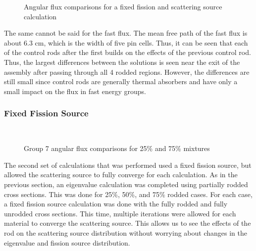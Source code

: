 \begin{figure}[H]
    \centering
    \hfill
    \caption{Angular flux comparisons for a fixed fission and scattering source calculation}\label{f:1dmoc-fixed-50-angflux}
\end{figure}

The same cannot be said for the fast flux.  The mean free path of the fast flux is about 6.3 cm, which is the width of five pin cells.  Thus, it can be seen that each of the control rods after the first builds on the effects of the previous control rod.  Thus, the largest differences between the solutions is seen near the exit of the assembly after passing through all 4 rodded regions.  However, the differences are still small since control rods are generally thermal absorbers and have only a small impact on the flux in fast energy groups.

\subsubsection{Fixed Fission Source}

\begin{figure}[H]
    \centering
    \hfill
    ~
    \caption{Group 7 angular flux comparisons for 25\% and 75\% mixtures}\label{f:1dmoc-angflux7}
\end{figure}

The second set of calculations that was performed used a fixed fission source, but allowed the scattering source to fully converge for each calculation.  As in the previous section, an eigenvalue calculation was completed using partially rodded cross sections.  This was done for 25\%, 50\%, and 75\% rodded cases.  For each case, a fixed fission source calculation was done with the fully rodded and fully unrodded cross sections.  This time, multiple iterations were allowed for each material to converge the scattering source.  This allows us to see the effects of the rod on the scattering source distribution without worrying about changes in the eigenvalue and fission source distribution.

